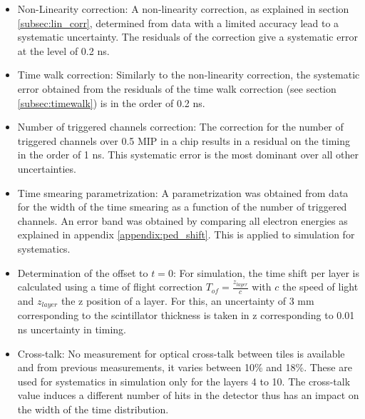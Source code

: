 \begin{itemize}
	\item Non-Linearity correction: A non-linearity correction, as explained in section \ref{subsec:lin_corr}, determined from data with a limited accuracy lead to a systematic uncertainty. The residuals of the correction give a systematic error at the level of 0.2 ns.
	\item Time walk correction: Similarly to the non-linearity correction, the systematic error obtained from the residuals of the time walk correction (see section \ref{subsec:timewalk}) is in the order of 0.2 ns.
	\item Number of triggered channels correction: The correction for the number of triggered channels over 0.5 MIP in a chip results in a residual on the timing in the order of 1 ns. This systematic error is the most dominant over all other uncertainties.
	\item Time smearing parametrization: A parametrization was obtained from data for the width of the time smearing as a function of the number of triggered channels. An error band was obtained by comparing all electron energies as explained in appendix \ref{appendix:ped_shift}. This is applied to simulation for systematics.
	\item Determination of the offset to $t=0$: For simulation, the time shift per layer is calculated using a time of flight correction $T_{of} = \frac{z_{layer}}{c}$ with $c$ the speed of light and $z_{layer}$ the z position of a layer. For this, an uncertainty of 3 mm corresponding to the scintillator thickness is taken in z corresponding to 0.01 ns uncertainty in timing.
	\item Cross-talk: No measurement for optical cross-talk between tiles is available and from previous measurements, it varies between 10\% and 18\%. These are used for systematics in simulation only for the layers 4 to 10. The cross-talk value induces a different number of hits in the detector thus has an impact on the width of the time distribution.

\end{itemize}
